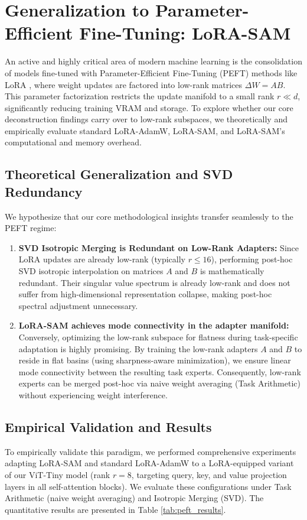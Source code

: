 \section{Generalization to Parameter-Efficient Fine-Tuning: LoRA-SAM}
\label{sec:lorasam}

An active and highly critical area of modern machine learning is the consolidation of models fine-tuned with Parameter-Efficient Fine-Tuning (PEFT) methods like LoRA \cite{lora}, where weight updates are factored into low-rank matrices $\Delta W = A B$. This parameter factorization restricts the update manifold to a small rank $r \ll d$, significantly reducing training VRAM and storage. To explore whether our core deconstruction findings carry over to low-rank subspaces, we theoretically and empirically evaluate standard LoRA-AdamW, LoRA-SAM, and LoRA-SAM's computational and memory overhead.

\subsection{Theoretical Generalization and SVD Redundancy}
We hypothesize that our core methodological insights transfer seamlessly to the PEFT regime:
\begin{enumerate}
  \item \textbf{SVD Isotropic Merging is Redundant on Low-Rank Adapters:} Since LoRA updates are already low-rank (typically $r \le 16$), performing post-hoc SVD isotropic interpolation on matrices $A$ and $B$ is mathematically redundant. Their singular value spectrum is already low-rank and does not suffer from high-dimensional representation collapse, making post-hoc spectral adjustment unnecessary.
  \item \textbf{LoRA-SAM achieves mode connectivity in the adapter manifold:} Conversely, optimizing the low-rank subspace for flatness during task-specific adaptation is highly promising. By training the low-rank adapters $A$ and $B$ to reside in flat basins (using sharpness-aware minimization), we ensure linear mode connectivity between the resulting task experts. Consequently, low-rank experts can be merged post-hoc via naive weight averaging (Task Arithmetic) without experiencing weight interference.
\end{enumerate}

\subsection{Empirical Validation and Results}
To empirically validate this paradigm, we performed comprehensive experiments adapting LoRA-SAM and standard LoRA-AdamW to a LoRA-equipped variant of our ViT-Tiny model (rank $r=8$, targeting query, key, and value projection layers in all self-attention blocks). We evaluate these configurations under Task Arithmetic (naive weight averaging) and Isotropic Merging (SVD). The quantitative results are presented in Table \ref{tab:peft_results}.

